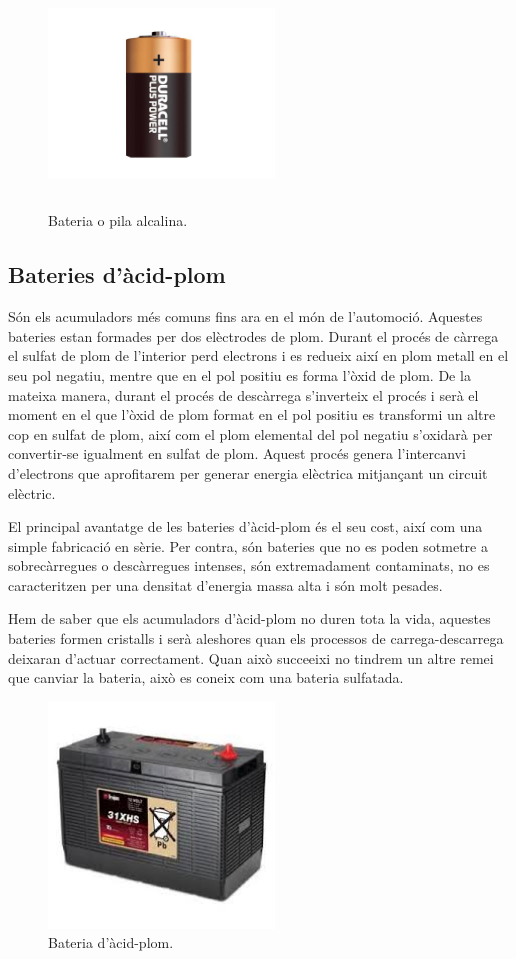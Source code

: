 \begin{figure}[H]
	\centering
    \includegraphics[width=6cm, height=6cm] {Bateries/pilaalcalina.jpg}
    \caption{Bateria o pila alcalina.}
\end{figure}

\subsection{Bateries d'àcid-plom}
Són els acumuladors més comuns fins ara en el món de l’automoció. Aquestes bateries estan formades per dos elèctrodes de plom. Durant el procés de càrrega el sulfat de plom de l’interior perd electrons i es redueix així en plom metall en el seu pol negatiu, mentre que en el pol positiu es forma l'òxid de plom. De la mateixa manera, durant el procés de descàrrega s’inverteix el procés i serà el moment en el que l’òxid de plom format en el pol positiu es transformi un altre cop en sulfat de plom, així com el plom elemental del pol negatiu s’oxidarà per convertir-se igualment en sulfat de plom. Aquest procés genera l’intercanvi d’electrons que aprofitarem per generar energia elèctrica mitjançant un circuit elèctric.

El principal avantatge de les bateries d’àcid-plom és el seu cost, així com una simple fabricació en sèrie. Per contra, són bateries que no es poden sotmetre a sobrecàrregues o descàrregues intenses, són extremadament contaminats, no es caracteritzen per una densitat d’energia massa alta i són molt pesades.

Hem de saber que els acumuladors d’àcid-plom no duren tota la vida, aquestes bateries formen cristalls i serà aleshores quan els processos de carrega-descarrega deixaran d’actuar correctament. Quan això succeeixi no tindrem un altre remei que canviar la bateria, això es coneix com una bateria sulfatada.
\bigskip \bigskip
\begin{figure}[H]
	\centering
    \includegraphics[width=6cm, height=6cm] {Bateries/acidplom.jpg}
    \caption{Bateria d'àcid-plom.}
\end{figure}

